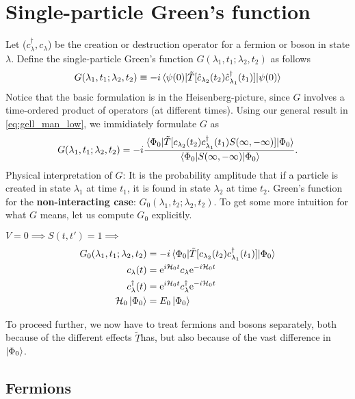 \section{Single-particle Green's function}
Let ($c_\lambda^\dagger, c_\lambda$) be the creation or destruction operator for a fermion or boson in state $\lambda$. Define the single-particle Green's function $G(\lambda_1, t_1;\lambda_2, t_2)$ as follows
\begin{equation} 
\label{eq:greens_definition}
G(\lambda_1, t_1;\lambda_2, t_2) \equiv -i\ev{\tilde{T}[\hat{c}_{\lambda_2}(t_2)\hat{c}_{\lambda_1}^\dagger(t_1)]}{\psi(0)}
\end{equation}
Notice that the basic formulation is in the Heisenberg-picture, since $G$ involves a time-ordered product of operators (at different times). Using our general result in \cref{eq:gell_man_low}, we immidiately formulate $G$ as
\begin{equation} 
G(\lambda_1, t_1;\lambda_2, t_2) = -i\frac{\ev{\tilde{T}[{c}_{\lambda_2}(t_2){c}_{\lambda_1}^\dagger(t_1)S(\infty, -\infty)]}{\Phi_0}}{\ev{S(\infty, -\infty)}{\Phi_0}}.
\end{equation}
Physical interpretation of $G$: It is the probability amplitude that if a particle is created in state $\lambda_1$ at time $t_1$, it is found in state $\lambda_2$ at time $t_2$. Green's function for the \textbf{non-interacting case}: $G_0(\lambda_1, t_2;\lambda_2, t_2)$. To get some more intuition for what $G$ means, let us compute $G_0$ explicitly. 

$V =0 \implies S(t, t') = 1 \implies$
\begin{align} 
\label{eq:non_int_greens_fermion}
G_0(\lambda_1, t_1; \lambda_2, t_2) &= -i\ev{\tilde{T}[c_{\lambda_2}(t_2)c_{\lambda_1}^\dagger(t_1)]}{\Phi_0}
\\
c_\lambda(t) &= \e^{i\Ha_0t}c_\lambda\e^{-i\Ha_0t} \\
c_\lambda^\dagger(t) &=
\e^{i\Ha_0t}c_\lambda^\dagger\e^{-i\Ha_0t} \\
\Ha_0\ket{\Phi_0} &= E_0\ket{\Phi_0}
\end{align}

To proceed further, we now have to treat fermions and bosons separately, both because of the different effects  $\tilde{T}$has, but also because of the vast difference in $\ket{\Phi_0}$.

\subsection{Fermions}

